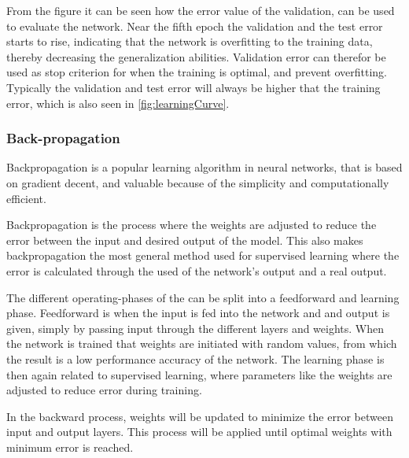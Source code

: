 From the figure it can be seen how the error value of the validation, can be used to evaluate the network. 
Near the fifth epoch the validation and the test error starts to rise, indicating that the network is overfitting to the training data, thereby decreasing the generalization abilities. 
Validation error can therefor be used as stop criterion for when the training is optimal, and prevent overfitting. 
Typically the validation and test error will always be higher that the training error, which is also seen in \autoref{fig:learningCurve}. \citep{Duda2000}
  
\subsubsection{Back-propagation}
Backpropagation is a popular learning algorithm in neural networks, that is based on gradient decent, and valuable because of the simplicity and computationally efficient. \citep{Bengio2012, Duda2000}

Backpropagation is the process where the weights are adjusted to reduce the error between the input and desired output of the model. This also makes backpropagation the most general method used for supervised learning where the error is calculated through the used of the network's output and a real output.\citep{Duda2000} 

The different operating-phases of the can be split into a feedforward and learning phase. 
Feedforward is when the input is fed into the network and and output is given, simply by passing input through the different layers and weights. 
When the network is trained that weights are initiated with random values, from which the result is a low performance accuracy of the network. 
The learning phase is then again related to supervised learning, where parameters like the weights are adjusted to reduce error during training. \citep{Duda2000}
   


In the backward process, weights will be updated to minimize the error between input and output layers.
This process will be applied until optimal weights with minimum error is reached.\citep{Hameed2016}





